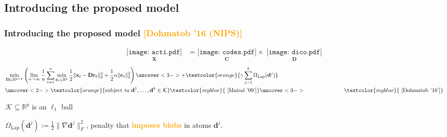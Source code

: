 \documentclass{beamer}
\def\mydot{\structure{\rule{1ex}{1ex}}\,}
\def\B#1{\mathbf{#1}}
\def\emph#1{\textbf{\textcolor{orange}{#1}}}
\newcommand{\mycite}[1]{\textcolor{myblue}{\text{ [#1]}}}
\begin{document}
\subsection{Introducing the proposed model}
\begin{frame}
  \frametitle{Introducing the proposed model \textcolor{orange}{[Dohmatob '16 (NIPS)]}}
  \vspace{-2.1em}
  \begin{equation*}
    \begin{split}
      \underset{\B{X}}{\texttt{[image: acti.pdf]}} &=  \underset{\B{C}}{\texttt{[image: codes.pdf]}} \times \;\underset{\B{D}}{\texttt{[image: dico.pdf]}}
      \end{split}
  \end{equation*}
\vspace{-1em}
\begin{eqnarray*}
  \begin{split}
    &\min_{\B{D} \in \mathbb R^{p \times k}}\left(\lim_{n \rightarrow \infty}\frac{1}{n}\sum_{t=1}^n\min_{\B{c}_t \in \mathbb R^{k}}\frac{1}{2} \|\B{x}_t-\B{D}\B{c}_t\|_2^2 +  \frac{1}{2}\alpha\|\B{c}_t\|_2^2\right) \uncover<3->{+ \textcolor{orange}{\gamma\sum_{j=1}^k\Omega_{\text{Lap}}(\B{d}^j)}}\\
    &\uncover<2->{\textcolor{orange}{\text{subject to } \B{d}^1,\ldots,\B{d}^k \in \mathcal K}\mycite{Mairal '09'}}\uncover<3->{\quad\quad\quad\quad\quad\quad\quad\mycite{Dohmatob '16'}}
  \end{split}
\end{eqnarray*}


 {
  \mydot $\mathcal K \subseteq \mathbb R^p$ is an $\ell_1$ ball

  \mydot $\Omega_{\text{Lap}}(\B{d}^j) := \frac{1}{2}\|\nabla \B{d}^j\|_F^2$, penalty that \emph{imposes blobs} in atoms $\B{d}^j$.
}

\end{frame}
\end{document}
